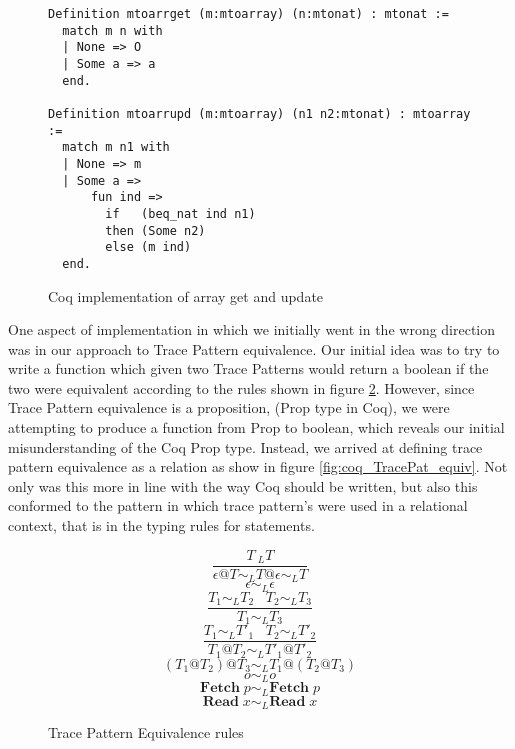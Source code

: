 \documentclass[10pt,  onecolumn]{article}
\begin{document}


\begin{figure}
\caption{ Coq implementation of array get and update}
\label{fig:coq_arrays}

\begin{lstlisting}
Definition mtoarrget (m:mtoarray) (n:mtonat) : mtonat :=
  match m n with
  | None => O
  | Some a => a
  end.

Definition mtoarrupd (m:mtoarray) (n1 n2:mtonat) : mtoarray :=
  match m n1 with
  | None => m
  | Some a =>
      fun ind =>
        if   (beq_nat ind n1)
        then (Some n2)
        else (m ind)
  end.
\end{lstlisting}

\end{figure}


One aspect of implementation in which we initially went in the wrong direction was in our approach to Trace Pattern equivalence.
Our initial idea was to try to write a function which given two Trace Patterns would return a boolean if the two were equivalent according to the rules shown in figure \ref{fig:mto_TracePat_equiv}.
However, since Trace Pattern equivalence is a proposition, (Prop type in Coq), we were attempting to produce a function from Prop to boolean, which reveals our initial misunderstanding of the Coq Prop type.
Instead, we arrived at defining trace pattern equivalence as a relation as show in figure \ref{fig:coq_TracePat_equiv}.
Not only was this more in line with the way Coq should be written, but also this conformed to the pattern in which trace pattern's were used in a relational context, that is in the typing rules for statements.


\begin{figure}
\caption{Trace Pattern Equivalence rules}
\label{fig:mto_TracePat_equiv}
\[
\frac {T ~_L T}
        {\epsilon @T  \sim_{L}T@\epsilon  \sim_{L} T}
\]
\[
\epsilon \sim_{L}  \epsilon
\]
\[
\frac {T_1 \sim_L T_2 \;\;\; T_2 \sim_L T_3}
        {T_1 \sim_L T_3}
\]
\[
\frac {T_1 \sim_L T'_1 \;\;\; T_2 \sim_L T'_2}
        {T_1@T_2 \sim_L T'_1@T'_2}
\]
\[
(T_1@T_2)@T_3 \sim_L T_1@(T_2@T_3)
\]
\[
o \sim_L o
\]
\[
\textbf{Fetch}\;p \sim_L \textbf{Fetch}\;p
\]
\[
\textbf{Read}\;x \sim_L \textbf{Read}\;x
\]

\end{figure}
\end{document}
